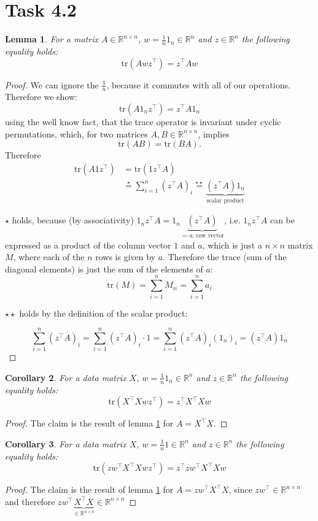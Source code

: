 \documentclass[10pt,a4paper]{article}
\newtheorem{lemma}{Lemma}
\newtheorem{corollary}[lemma]{Corollary}
\newcommand {\R} {\mathbb{R}}
\newcommand{\tr}{\text{tr}}
\newcommand{\1}{\mymathbb{1}}
\begin{document}
\section*{Task 4.2}

\begin{lemma} \label{l1}
    For a matrix $A\in\R^{n\times n}$, $w=\frac{1}{n}1_n\in \R^n$ and $z\in\R^n$ the following equality holds:
    \[\tr(Awz^\intercal)=z^\intercal A w\]
\end{lemma}

\begin{proof}
    We can ignore the $\frac{1}{n}$, because it commutes with all of our operations. Therefore we show:
    \[\tr(A1_nz^\intercal)=z^\intercal A 1_n\]
    using the well know fact, that the trace operator is invariant under cyclic permutations, which, for two matrices $A,B\in\R^{n\times n}$, implies 
    \[\tr(AB)=\tr(BA).\]
    Therefore
    \begin{align*}
        \tr(A1z^\intercal)&=\tr(1z^\intercal A)\\
        &\stackrel{\star}{=}\sum_{i=1}^n(z^\intercal A)_i
        \stackrel{\star\star}{=}\underbrace{(z^\intercal A)1_n}_{\text{scalar product}}
    \end{align*}

    $\star$ holds, because (by associativity) $1_nz^\intercal A=1_n\underbrace{(z^\intercal A)}_{\eqqcolon a\text{, row vector}}$, i.e. 
    $1_nz^\intercal A$ can be expressed as a product of the column vector $1$ and $a$, which is just a $n\times n$ matrix $M$,
    where each of the $n$ rows is given by $a$. Therefore the trace (sum of the diagonal elements) is just the sum of the elements of $a$:
    \[\tr(M)=\sum_{i=1}^n M_{ii}=\sum_{i=1}^n a_i\]

    $\star\star$ holds by the definition of the scalar product:

    \[\sum_{i=1}^n(z^\intercal A)_i=\sum_{i=1}^n(z^\intercal A)_i\cdot 1 =\sum_{i=1}^n(z^\intercal A)_i(1_n)_i=(z^\intercal A)1_n \]

\end{proof}

\begin{corollary}
    For a data matrix $X$, $w=\frac{1}{n}1_n\in \R^n$ and $z\in\R^n$ the following equality holds:
    \[\tr(X^\intercal Xwz^\intercal)=z^\intercal X^\intercal X w\]
\end{corollary}

\begin{proof}
    The claim is the result of lemma \ref{l1} for $A=X^\intercal X$.
\end{proof}

\begin{corollary}
    For a data matrix $X$, $w=\frac{1}{n}1\in \R^n$ and $z\in\R^n$ the following equality holds:
    \[\tr(zw^\intercal X^\intercal Xwz^\intercal)=z^\intercal zw^\intercal X^\intercal Xw\]
\end{corollary}

\begin{proof}
    The claim is the result of lemma \ref{l1} for $A=zw^\intercal X^\intercal X$, since 
    $zw^\intercal\in \R^{n\times n}$ and therefore $zw^\intercal \underbrace{ X^\intercal X}_{\in \R^{n\times n}} \in \R^{n\times n}$
\end{proof}
\end{document}
